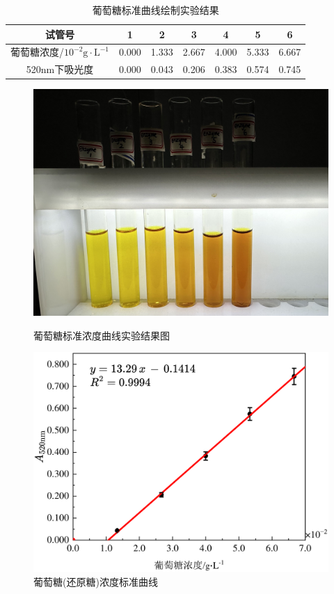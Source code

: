 \begin{table}[H]
\centering
\caption{葡萄糖标准曲线绘制实验结果}
\label{tab:result_GLUCOSE_STD}
\begin{tabular}{@{}ccccccc@{}}
\toprule
试管号       & 1     & 2     & 3     & 4     & 5     & 6     \\ \midrule
葡萄糖浓度/$10^{-2}\mathrm{g \cdot L^{-1}}$    & 0.000 & 1.333 & 2.667 & 4.000 & 5.333 & 6.667 \\
520nm下吸光度 & 0.000 & 0.043 & 0.206 & 0.383 & 0.574 & 0.745 \\ \bottomrule
\end{tabular}
\end{table}
\begin{figure}[H]
    \begin{minipage}[t]{0.48\textwidth}
    \includegraphics[width = \textwidth]{figure/1124/Glucose_STD.jpg}
    \caption{葡萄糖标准浓度曲线实验结果图}
    \label{fig:STD_Glucose_fig}
    \end{minipage}
    \begin{minipage}[t]{0.50\textwidth}
        \includegraphics[width = \textwidth]{figure/1124/Glucose_STD.pdf}
        \caption{葡萄糖(还原糖)浓度标准曲线}
        \label{fig:STD_Glucose}
    \end{minipage}
\end{figure}

